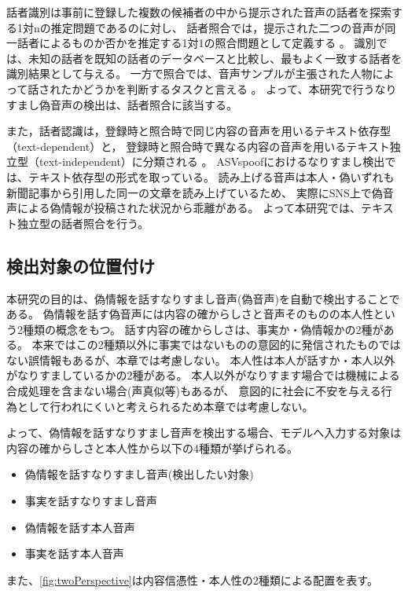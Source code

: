 話者識別は事前に登録した複数の候補者の中から提示された音声の話者を探索する1対nの推定問題であるのに対し、
話者照合では，提示された二つの音声が同一話者によるものか否かを推定する1対1の照合問題として定義する \cite{俵直弘2022}。
識別では、未知の話者を既知の話者のデータベースと比較し、最もよく一致する話者を識別結果として与える。
一方で照合では、音声サンプルが主張された人物によって話されたかどうかを判断するタスクと言える \cite{1561284}。
よって、本研究で行うなりすまし偽音声の検出は、話者照合に該当する。

また，話者認識は，登録時と照合時で同じ内容の音声を用いるテキスト依存型（text-dependent）と，
登録時と照合時で異なる内容の音声を用いるテキスト独立型（text-independent）に分類される \cite{俵直弘2022}。
ASVspoofにおけるなりすまし検出では、テキスト依存型の形式を取っている。
読み上げる音声は本人・偽いずれも新聞記事から引用した同一の文章を読み上げているため、
実際にSNS上で偽音声による偽情報が投稿された状況から乖離がある。
よって本研究では、テキスト独立型の話者照合を行う。

\subsection{検出対象の位置付け}
本研究の目的は、偽情報を話すなりすまし音声(偽音声)を自動で検出することである。
偽情報を話す偽音声には内容の確からしさと音声そのものの本人性という2種類の概念をもつ。
話す内容の確からしさは、事実か・偽情報かの2種がある。
本来ではこの2種類以外に事実ではないものの意図的に発信されたものではない誤情報もあるが、本章では考慮しない。
本人性は本人が話すか・本人以外がなりすましているかの2種がある。
本人以外がなりすます場合では機械による合成処理を含まない場合(声真似等)もあるが、
意図的に社会に不安を与える行為として行われにくいと考えられるため本章では考慮しない。

よって、偽情報を話すなりすまし音声を検出する場合、モデルへ入力する対象は内容の確からしさと本人性から以下の4種類が挙げられる。

\begin{itemize}
    \item 偽情報を話すなりすまし音声(検出したい対象)
    \item 事実を話すなりすまし音声
    \item 偽情報を話す本人音声
    \item 事実を話す本人音声
\end{itemize}

また、\cref{fig:twoPerspective}は内容信憑性・本人性の2種類による配置を表す。

